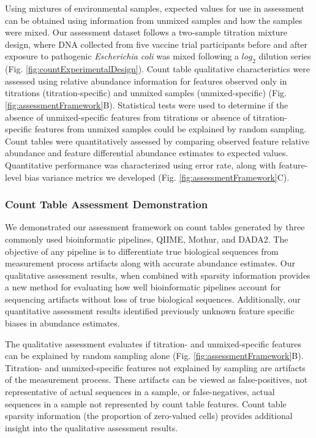 \documentclass{bmcart}
\begin{document}
Using mixtures of environmental samples, expected values for use in assessment
can be obtained using information from unmixed samples and how the samples were mixed.
Our assessment dataset follows a two-sample titration mixture design, where DNA collected from five vaccine trial participants before and
after exposure to pathogenic \emph{Escherichia coli}  was mixed following a \(log_2\) dilution
series (Fig. \ref{fig:countExperimentalDesign}).
Count table qualitative characteristics were assessed using relative abundance information for
features observed only in titrations (titration-specific) and unmixed samples (unmixed-specific) (Fig. \ref{fig:assessmentFramework}B).
Statistical tests were used to determine if the absence of unmixed-specific features from titrations or absence of titration-specific features from unmixed samples could be explained by random sampling.
Count tables were quantitatively assessed by comparing observed feature relative abundance and feature differential abundance estimates to expected values.
Quantitative performance was characterized using error rate, along with feature-level bias variance metrics we developed (Fig. \ref{fig:assessmentFramework}C).


\subsubsection*{Count Table Assessment Demonstration}
We demonstrated our assessment framework on count tables generated by three commonly used bioinformatic pipelines, QIIME, Mothur, and DADA2.
The objective of any pipeline is to differentiate true biological sequences from measurement process artifacts along with accurate abundance estimates.
Our qualitative assessment results, when combined with sparsity information provides a
new method for evaluating how well bioinformatic pipelines account for sequencing artifacts without loss of true biological sequences.
Additionally, our quantitative assessment results identified previously unknown feature specific biases in abundance estimates.

The qualitative assessment evaluates if titration- and unmixed-specific features can be explained by random sampling alone (Fig. \ref{fig:assessmentFramework}B).
Titration- and unmixed-specific features not explained by sampling are artifacts of the measurement process.
These artifacts can be viewed as false-positives, not representative of actual sequences in a sample,
or false-negatives, actual sequences in a sample not represented by count table features.
Count table sparsity information (the proportion of zero-valued cells) provides
additional insight into the qualitative assessment results.
\end{document}
